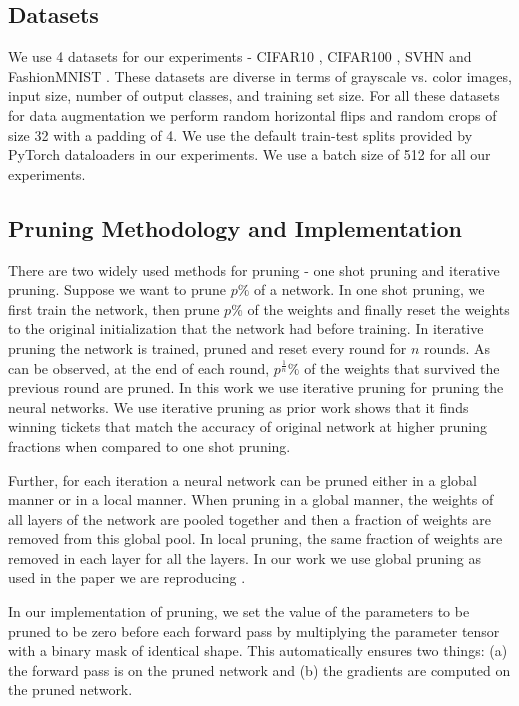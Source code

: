 \documentclass{article}
\begin{document}
\subsection{Datasets}
We use 4 datasets for our experiments - CIFAR10 \cite{cifar}, CIFAR100 \cite{cifar}, SVHN \cite{svhn} and FashionMNIST \cite{fashionmnist}. These datasets are diverse in terms of grayscale vs. color images, input size, number of output classes,
and training set size. For all these datasets for data augmentation we perform random horizontal flips and random crops of size 32 with a padding of 4. We use the default train-test splits provided by PyTorch dataloaders in our experiments. We use a batch size of 512 for all our experiments. 


\subsection{Pruning Methodology and Implementation}
There are two widely used methods for pruning - one shot pruning and iterative pruning. Suppose we want to prune $p\%$ of a network.  In one shot pruning, we first train the network, then prune $p\%$ of the weights and finally reset the weights to the original initialization that the network had before training. In iterative pruning the network is trained, pruned and reset every round for $n$ rounds. As can be observed, at the end of each round, $p^{\frac{1}{n}} \%$ of the weights that survived the previous round are pruned. In this work we use iterative pruning for pruning the neural networks.  We use iterative pruning as prior work \cite{lth_orig_paper} shows that it finds winning tickets that match the accuracy of original network at higher pruning fractions when compared to one shot pruning.

Further, for each iteration a neural network can be pruned either in a global manner or in a local manner. When pruning in a global manner, the weights of all layers of the network are pooled together and then a fraction of weights are removed from this global pool. In local pruning, the same fraction of weights are removed in each layer for all the layers. In our work we use global pruning as used in the paper we are reproducing \cite{repro_paper}.

In our implementation of pruning,  we set the value of the parameters to be pruned to be zero before each forward pass by multiplying the parameter tensor with a binary mask of identical shape. This automatically ensures two things: (a) the forward pass is on the pruned network and (b) the gradients are computed on the pruned network. 
\end{document}
